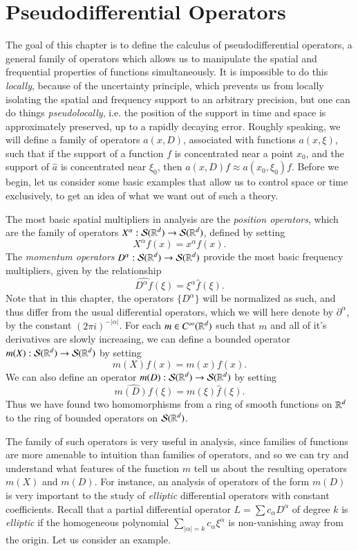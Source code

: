\chapter{Pseudodifferential Operators}

The goal of this chapter is to define the calculus of pseudodifferential operators, a general family of operators which allows us to manipulate the spatial and frequential properties of functions simultaneously. It is impossible to do this \emph{locally}, because of the uncertainty principle, which prevents us from locally isolating the spatial and frequency support to an arbitrary precision, but one can do things \emph{pseudolocally}, i.e. the position of the support in time and space is approximately preserved, up to a rapidly decaying error. Roughly speaking, we will define a family of operators $a(x,D)$, associated with functions $a(x,\xi)$, such that if the support of a function $f$ is concentrated near a point $x_0$, and the support of $\widehat{a}$ is concentrated near $\xi_0$, then $a(x,D) f \approx a(x_0,\xi_0) f$. Before we begin, let us consider some basic examples that allow us to control space or time exclusively, to get an idea of what we want out of such a theory.

The most basic spatial multipliers in analysis are the \emph{position operators}, which are the family of operators $X^\alpha: \mathcal{S}(\operatorname{\mathbb{R}}^d) \to \mathcal{S}(\operatorname{\mathbb{R}}^d)$, defined by setting
%
\[ X^\alpha f(x) = x^\alpha f(x). \]
%
The \emph{momentum operators} $D^\alpha: \mathcal{S}(\operatorname{\mathbb{R}}^d) \to \mathcal{S}(\operatorname{\mathbb{R}}^d)$ provide the most basic frequency multipliers, given by the relationship
%
\[ \widehat{D^\alpha f}(\xi) = \xi^\alpha \widehat{f}(\xi). \]
%
Note that in this chapter, the operators $\{ D^\alpha \}$ will be normalized as such, and thus differ from the usual differential operators, which we will here denote by $\partial^\alpha$, by the constant $(2 \pi i)^{-|\alpha|}$. For each $m \in C^\infty(\operatorname{\mathbb{R}}^d)$ such that $m$ and all of it's derivatives are slowly increasing, we can define a bounded operator $m(X): \mathcal{S}(\operatorname{\mathbb{R}}^d) \to \mathcal{S}(\operatorname{\mathbb{R}}^d)$ by setting
%
\[ m(X) f(x) = m(x) f(x). \]
%
We can also define an operator $m(D): \mathcal{S}(\operatorname{\mathbb{R}}^d) \to \mathcal{S}(\operatorname{\mathbb{R}}^d)$ by setting
%
\[ \widehat{m(D) f}(\xi) = m(\xi) \widehat{f}(\xi). \]
%
Thus we have found two homomorphisms from a ring of smooth functions on $\operatorname{\mathbb{R}}^d$ to the ring of bounded operators on $\mathcal{S}(\operatorname{\mathbb{R}}^d)$.

The family of such operators is very useful in analysis, since families of functions are more amenable to intuition than families of operators, and so we can try and understand what features of the function $m$ tell us about the resulting operators $m(X)$ and $m(D)$. For instance, an analysis of operators of the form $m(D)$ is very important to the study of \emph{elliptic} differential operators with constant coefficients. Recall that a partial differential operator $L = \sum c_\alpha D^\alpha$ of degree $k$ is \emph{elliptic} if the homogeneous polynomial $\sum_{|\alpha| = k} c_\alpha \xi^\alpha$ is non-vanishing away from the origin. Let us consider an example.

